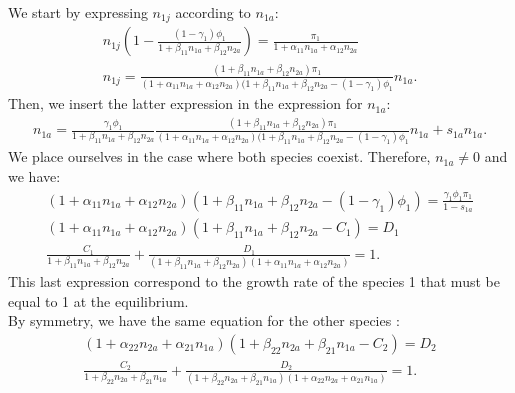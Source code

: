 \documentclass{article}
\begin{document}
We start by expressing $n_{1j}$ according to $n_{1a}$:
\begin{align*}
    n_{1j}\left(1-\frac{(1-\gamma_1)\phi_1}{1+\beta_{11}n_{1a}+\beta_{12}n_{2a}}\right) = \frac{\pi_1}{1+\alpha_{11}n_{1a}+\alpha_{12}n_{2a}}\\
    n_{1j} = \frac{(1+\beta_{11}n_{1a}+\beta_{12}n_{2a})\pi_1}{(1+\alpha_{11}n_{1a}+\alpha_{12}n_{2a})(1+\beta_{11}n_{1a}+\beta_{12}n_{2a}-(1-\gamma_1)\phi_1}n_{1a}.
\end{align*}
Then, we insert the latter expression in the expression for $n_{1a}$:
\begin{align*}
    n_{1a} = \frac{\gamma_1\phi_1}{1+\beta_{11}n_{1a}+\beta_{12}n_{2a}}\frac{(1+\beta_{11}n_{1a}+\beta_{12}n_{2a})\pi_1}{(1+\alpha_{11}n_{1a}+\alpha_{12}n_{2a})(1+\beta_{11}n_{1a}+\beta_{12}n_{2a}-(1-\gamma_1)\phi_1}n_{1a} + s_{1a}n_{1a}.
\end{align*}
We place ourselves in the case where both species coexist. Therefore, $n_{1a} \neq 0$ and we have:
\begin{align*}
    (1+\alpha_{11}n_{1a}+\alpha_{12}n_{2a})(1+\beta_{11}n_{1a}+\beta_{12}n_{2a}-(1-\gamma_1)\phi_1) = \frac{\gamma_1\phi_1\pi_1}{1-s_{1a}}\\
    (1+\alpha_{11}n_{1a}+\alpha_{12}n_{2a})(1+\beta_{11}n_{1a}+\beta_{12}n_{2a}-C_1) = D_1\\
    \frac{C_1}{1+\beta_{11}n_{1a}+\beta_{12}n_{2a}} + \frac{D_1}{(1+\beta_{11}n_{1a}+\beta_{12}n_{2a})(1+\alpha_{11}n_{1a}+\alpha_{12}n_{2a})} = 1.
\end{align*}
This last expression correspond to the growth rate of the species 1 that must be equal to 1 at the equilibrium. \\
By symmetry, we have the same equation for the other species :
\begin{align*}
    (1+\alpha_{22}n_{2a}+\alpha_{21}n_{1a})(1+\beta_{22}n_{2a}+\beta_{21}n_{1a}-C_2) = D_2\\
    \frac{C_2}{1+\beta_{22}n_{2a}+\beta_{21}n_{1a}} + \frac{D_2}{(1+\beta_{22}n_{2a}+\beta_{21}n_{1a})(1+\alpha_{22}n_{2a}+\alpha_{21}n_{1a})} = 1.
\end{align*}
\end{document}
